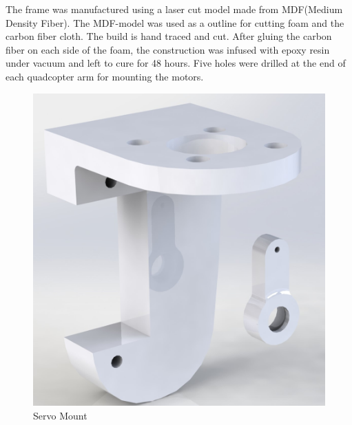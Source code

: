 \begin{figure}[H]
\end{figure} 
\noindent

The frame was manufactured using a laser cut model made from MDF(Medium Density Fiber). The MDF-model was used as a outline for cutting foam and the carbon fiber cloth. The build is hand traced and cut. After gluing the carbon fiber on each side of the foam, the construction was infused with epoxy resin under vacuum and left to cure for 48 hours. Five holes were drilled at the end of each quadcopter arm for mounting the motors. 

\begin{figure}[H]
        \centering
                \begin{minipage}[b]{0.3\textwidth}
            \includegraphics[width = \textwidth, angle= 0]{VAPIQ-PICTURES/ServoMountRender.jpg}
            \caption{Servo Mount}
            \label{fig:Bracket}
                    \end{minipage}
                 \hfill
         \begin{minipage}[b]{0.5\textwidth}

\end{minipage}
\end{figure}
